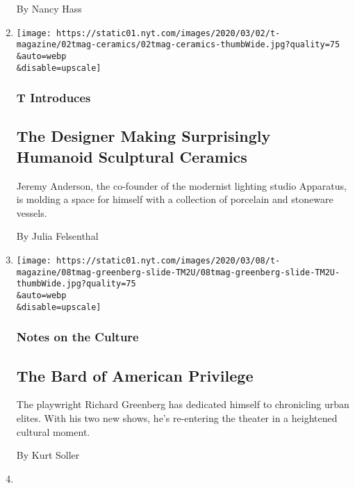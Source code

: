 \begin{enumerate}
  By Nancy Hass
\item
  \href{/2020/03/03/t-magazine/jeremy-anderson-ceramics.html}{}

  \texttt{[image: https://static01.nyt.com/images/2020/03/02/t-magazine/02tmag-ceramics/02tmag-ceramics-thumbWide.jpg?quality=75\\\&auto=webp\\\&disable=upscale]}

  \hypertarget{t-introduces}{%
  \subsubsection{T Introduces}\label{t-introduces}}

  \hypertarget{the-designer-making-surprisingly-humanoid-sculptural-ceramics}{%
  \subsection{The Designer Making Surprisingly Humanoid Sculptural
  Ceramics}\label{the-designer-making-surprisingly-humanoid-sculptural-ceramics}}

  Jeremy Anderson, the co-founder of the modernist lighting studio
  Apparatus, is molding a space for himself with a collection of
  porcelain and stoneware vessels.

  By Julia Felsenthal
\item
  \href{/2020/03/03/t-magazine/richard-greenberg-playwright.html}{}

  \texttt{[image: https://static01.nyt.com/images/2020/03/08/t-magazine/08tmag-greenberg-slide-TM2U/08tmag-greenberg-slide-TM2U-thumbWide.jpg?quality=75\\\&auto=webp\\\&disable=upscale]}

  \hypertarget{notes-on-the-culture-2}{%
  \subsubsection{Notes on the Culture}\label{notes-on-the-culture-2}}

  \hypertarget{the-bard-of-american-privilege}{%
  \subsection{The Bard of American
  Privilege}\label{the-bard-of-american-privilege}}

  The playwright Richard Greenberg has dedicated himself to chronicling
  urban elites. With his two new shows, he's re-entering the theater in
  a heightened cultural moment.

  By Kurt Soller
\item
  \href{/2020/03/02/t-magazine/brasserie-rosie-paris.html}{}


\end{enumerate}
